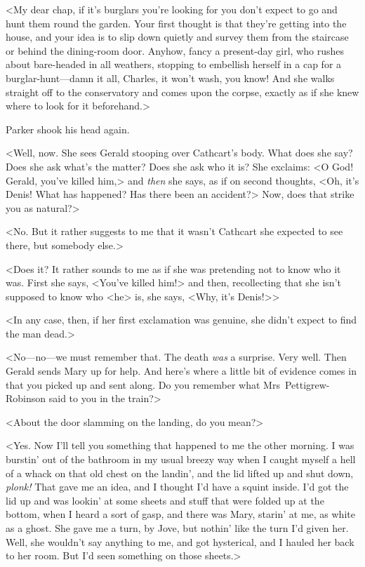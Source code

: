 <My dear chap, if it's burglars you're looking for you don't expect to go and hunt them round the garden. Your first thought is that they're getting into the house, and your idea is to slip down quietly and survey them from the staircase or behind the dining-room door. Anyhow, fancy a present-day girl, who rushes about bare-headed in all weathers, stopping to embellish herself in a cap for a burglar-hunt—damn it all, Charles, it won't wash, you know! And she walks straight off to the conservatory and comes upon the corpse, exactly as if she knew where to look for it beforehand.>

Parker shook his head again.

<Well, now. She sees Gerald stooping over Cathcart's body. What does she say? Does she ask what's the matter? Does she ask who it is? She exclaims: <O God! Gerald, you've killed him,> and \emph{then} she says, as if on second thoughts, <Oh, it's Denis! What has happened? Has there been an accident?> Now, does that strike you as natural?>

<No. But it rather suggests to me that it wasn't Cathcart she expected to see there, but somebody else.>

<Does it? It rather sounds to me as if she was pretending not to know who it was. First she says, <You've killed him!> and then, recollecting that she isn't supposed to know who <he> is, she says, <Why, it's Denis!>>

<In any case, then, if her first exclamation was genuine, she didn't expect to find the man dead.>

<No—no—we must remember that. The death \emph{was} a surprise. Very well.  Then Gerald sends Mary up for help. And here's where a little bit of evidence comes in that you picked up and sent along. Do you remember what Mrs~Pettigrew-Robinson said to you in the train?>

<About the door slamming on the landing, do you mean?>

<Yes. Now I'll tell you something that happened to me the other morning. I was burstin' out of the bathroom in my usual breezy way when I caught myself a hell of a whack on that old chest on the landin', and the lid lifted up and shut down, \emph{plonk!} That gave me an idea, and I thought I'd have a squint inside. I'd got the lid up and was lookin' at some sheets and stuff that were folded up at the bottom, when I heard a sort of gasp, and there was Mary, starin' at me, as white as a ghost.  She gave me a turn, by Jove, but nothin' like the turn I'd given her.  Well, she wouldn't say anything to me, and got hysterical, and I hauled her back to her room. But I'd seen something on those sheets.>

